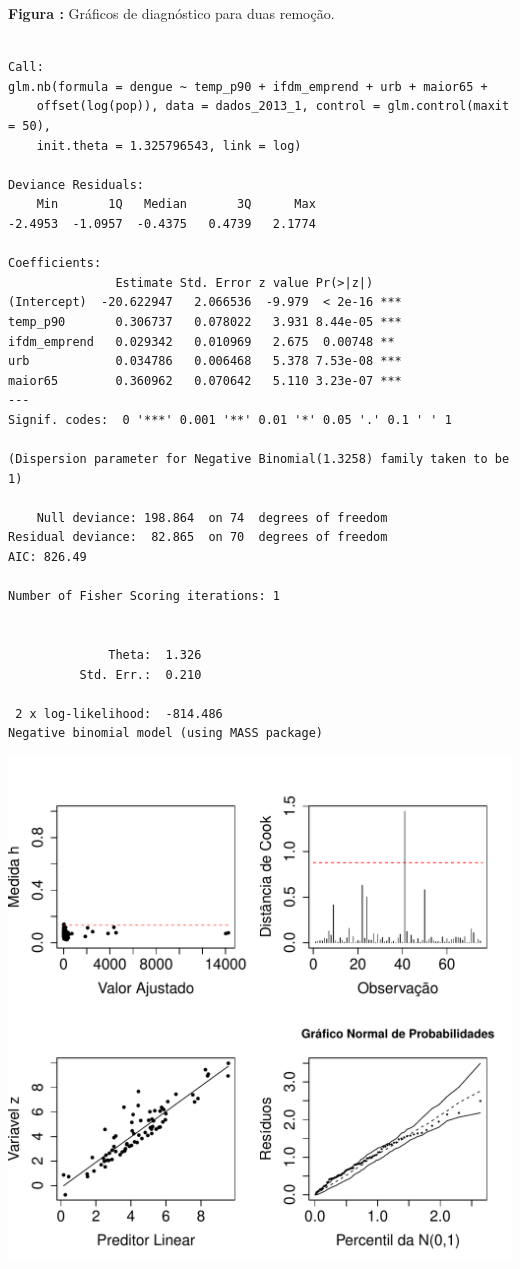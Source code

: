 \documentclass[12pt,a4paper]{article}\usepackage[]{graphicx}\usepackage[]{color}
\makeatletter
\def\maxwidth{ %
  \ifdim\Gin@nat@width>\linewidth
    \linewidth
  \else
    \Gin@nat@width
  \fi
}
\newenvironment{kframe}{%
 \def\at@end@of@kframe{}%
 \ifinner\ifhmode%
  \def\at@end@of@kframe{\end{minipage}}%
  \begin{minipage}{\columnwidth}%
 \fi\fi%
 \def\FrameCommand##1{\hskip\@totalleftmargin \hskip-\fboxsep
 \colorbox{shadecolor}{##1}\hskip-\fboxsep
     \hskip-\linewidth \hskip-\@totalleftmargin \hskip\columnwidth}%
 \MakeFramed {\advance\hsize-\width
   \@totalleftmargin\z@ \linewidth\hsize
   \@setminipage}}%
 {\par\unskip\endMakeFramed%
 \at@end@of@kframe}
\newenvironment{knitrout}{}{} %
\makeatother
\begin{document}
\begin{knitrout}
\end{knitrout}
\textbf{Figura :} Gráficos de diagnóstico para duas remoção.





\begin{knitrout}
\color{fgcolor}\begin{kframe}
\begin{verbatim}

Call:
glm.nb(formula = dengue ~ temp_p90 + ifdm_emprend + urb + maior65 + 
    offset(log(pop)), data = dados_2013_1, control = glm.control(maxit = 50), 
    init.theta = 1.325796543, link = log)

Deviance Residuals: 
    Min       1Q   Median       3Q      Max  
-2.4953  -1.0957  -0.4375   0.4739   2.1774  

Coefficients:
               Estimate Std. Error z value Pr(>|z|)    
(Intercept)  -20.622947   2.066536  -9.979  < 2e-16 ***
temp_p90       0.306737   0.078022   3.931 8.44e-05 ***
ifdm_emprend   0.029342   0.010969   2.675  0.00748 ** 
urb            0.034786   0.006468   5.378 7.53e-08 ***
maior65        0.360962   0.070642   5.110 3.23e-07 ***
---
Signif. codes:  0 '***' 0.001 '**' 0.01 '*' 0.05 '.' 0.1 ' ' 1

(Dispersion parameter for Negative Binomial(1.3258) family taken to be 1)

    Null deviance: 198.864  on 74  degrees of freedom
Residual deviance:  82.865  on 70  degrees of freedom
AIC: 826.49

Number of Fisher Scoring iterations: 1


              Theta:  1.326 
          Std. Err.:  0.210 

 2 x log-likelihood:  -814.486 
Negative binomial model (using MASS package) 
\end{verbatim}
\end{kframe}
\includegraphics[width=\maxwidth]{figure/unnamed-chunk-25-1} 

\end{knitrout}
\end{document}
